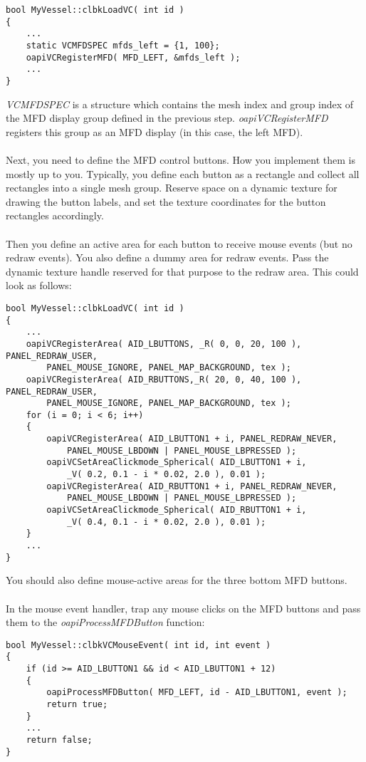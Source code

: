 \documentclass[Orbiter Developer Manual.tex]{subfiles}
\begin{document}
\begin{lstlisting}
bool MyVessel::clbkLoadVC( int id )
{
	...
	static VCMFDSPEC mfds_left = {1, 100};
	oapiVCRegisterMFD( MFD_LEFT, &mfds_left );
	...
}
\end{lstlisting}

\noindent
\textit{VCMFDSPEC} is a structure which contains the mesh index and group index of the MFD display group defined in the previous step. \textit{oapiVCRegisterMFD} registers this group as an MFD display (in this case, the left MFD).\\
\\
Next, you need to define the MFD control buttons. How you implement them is mostly up to you. Typically, you define each button as a rectangle and collect all rectangles into a single mesh group. Reserve space on a dynamic texture for drawing the button labels, and set the texture coordinates for the button rectangles accordingly.\\
\\
Then you define an active area for each button to receive mouse events (but no redraw events). You also define a dummy area for redraw events. Pass the dynamic texture handle reserved for that purpose to the redraw area. This could look as follows:

\begin{lstlisting}
bool MyVessel::clbkLoadVC( int id )
{
	...
	oapiVCRegisterArea( AID_LBUTTONS, _R( 0, 0, 20, 100 ), PANEL_REDRAW_USER,
		PANEL_MOUSE_IGNORE, PANEL_MAP_BACKGROUND, tex );
	oapiVCRegisterArea( AID_RBUTTONS,_R( 20, 0, 40, 100 ), PANEL_REDRAW_USER,
		PANEL_MOUSE_IGNORE, PANEL_MAP_BACKGROUND, tex );
	for (i = 0; i < 6; i++)
	{
		oapiVCRegisterArea( AID_LBUTTON1 + i, PANEL_REDRAW_NEVER,
			PANEL_MOUSE_LBDOWN | PANEL_MOUSE_LBPRESSED );
		oapiVCSetAreaClickmode_Spherical( AID_LBUTTON1 + i,
			_V( 0.2, 0.1 - i * 0.02, 2.0 ), 0.01 );
		oapiVCRegisterArea( AID_RBUTTON1 + i, PANEL_REDRAW_NEVER,
			PANEL_MOUSE_LBDOWN | PANEL_MOUSE_LBPRESSED );
		oapiVCSetAreaClickmode_Spherical( AID_RBUTTON1 + i,
			_V( 0.4, 0.1 - i * 0.02, 2.0 ), 0.01 );
	}
	...
}
\end{lstlisting}

\noindent
You should also define mouse-active areas for the three bottom MFD buttons.\\
\\
In the mouse event handler, trap any mouse clicks on the MFD buttons and pass them to the \textit{oapiProcessMFDButton} function:

\begin{lstlisting}
bool MyVessel::clbkVCMouseEvent( int id, int event )
{
	if (id >= AID_LBUTTON1 && id < AID_LBUTTON1 + 12)
	{
		oapiProcessMFDButton( MFD_LEFT, id - AID_LBUTTON1, event );
		return true;
	}
	...
	return false;
}
\end{lstlisting}
\end{document}
